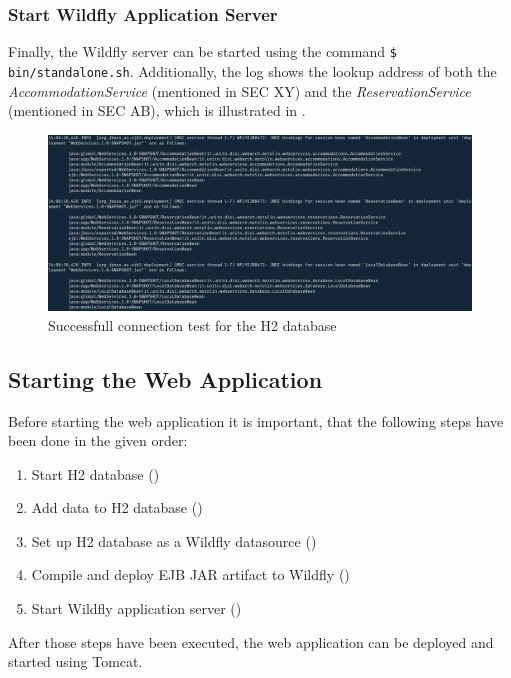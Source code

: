 \subsubsection{Start Wildfly Application Server}\label{sec:03_depl_wildfly_start}
Finally, the Wildfly server can be started using the command \texttt{\$ bin/standalone.sh}. Additionally, the log shows the lookup address of both the \textit{AccommodationService} (mentioned in SEC XY) and the \textit{ReservationService} (mentioned in SEC AB), which is illustrated in .
\begin{figure}[h]
\centering
\includegraphics[scale=0.13]{images/03_depl/deployed_beans}
\caption{Successfull connection test for the H2 database}
\label{fig:03_depl_wildfly_start_addresses}
\end{figure}


\subsection{Starting the Web Application}\label{sec:03_depl_webapp}
Before starting the web application it is important, that the following steps have been done in the given order:
\begin{enumerate}
\item Start H2 database ()
\item Add data to H2 database ()
\item Set up H2 database as a Wildfly datasource ()
\item Compile and deploy EJB JAR artifact to Wildfly ()
\item Start Wildfly application server ()
\end{enumerate}

After those steps have been executed, the web application can be deployed and started using Tomcat.

